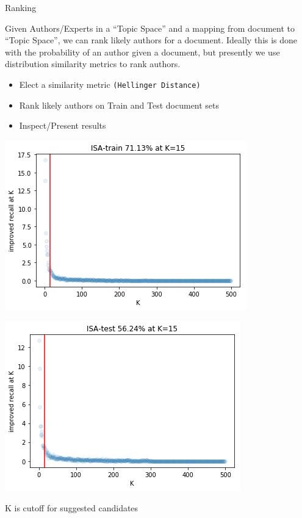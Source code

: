 \documentclass[10pt]{beamer}
\begin{document}
\begin{frame}{Ranking}

  Given Authors/Experts in a ``Topic Space'' and a mapping from document to ``Topic Space'', we can rank likely authors for a document. Ideally this is done with the probability of an author given a document, but presently we use distribution similarity metrics to rank authors.

  \begin{itemize}
  \item Elect a similarity metric \texttt{(Hellinger Distance)}
  \item Rank likely authors on Train and Test document sets
  \item Inspect/Present results
  \end{itemize}

  \begin{multicols}{2}
    \includegraphics[width=\columnwidth]{./recall-train-isa.png}

    \includegraphics[width=\columnwidth]{./recall-test-isa.png}
  \end{multicols}

  K is cutoff for suggested candidates
\end{frame}
\end{document}
